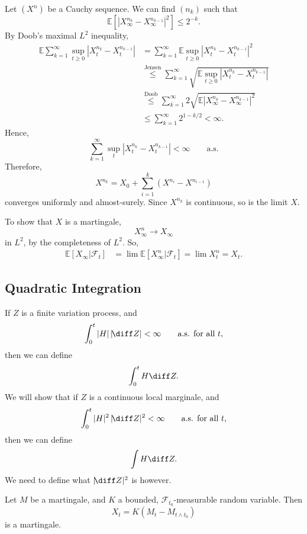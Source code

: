 \documentclass[12pt]{article}
\begin{document}
\begin{proofbox}
	Let $(X^{n})$ be a Cauchy sequence. We can find $(n_k)$ such that
	\[
	\mathbb{E}[|X_\infty^{n_k} - X_\infty^{n_{k-1}}|^2] \leq 2^{-k}.
	\]
	By Doob's maximal $L^2$ inequality,
	\begin{align*}
		\mathbb{E} \sum_{k = 1}^{\infty} \sup_{t \geq 0} |X_t^{n_k} - X_t^{n_{k-1}}| &= \sum_{k = 1}^{\infty} \mathbb{E} \sup_{t \geq 0} |X_t^{n_k} - X_t^{n_{k-1}}|^2 \\
											     &\overset{\text{Jensen}}\leq \sum_{k = 1}^{\infty} \sqrt{\mathbb{E} \sup_{t \geq 0} |X_t^{n_k} - X_t^{n_{k-1}}|} \\
											     &\overset{\text{Doob}}\leq \sum_{k = 1}^{\infty} 2 \sqrt{\mathbb{E} |X_\infty^{n_k} - X_\infty^{n_{k-1}}|^2} \\
											     &\leq \sum_{k = 1}^{\infty} 2^{1 - k/2} < \infty.
	\end{align*}
	Hence,
	\[
		\sum_{k=1}^{\infty} \sup_{t} |X_t^{n_k} - X_t^{n_{k-1}}| < \infty \qquad \text{a.s.}
	\]
	Therefore,
	\[
	X^{n_k} = X_0 + \sum_{i = 1}^{k} (X^{n_i} - X^{n_{i-1}})
	\]
	converges uniformly and almost-surely. Since $X^{n_k}$ is continuous, so is the limit $X$.

	To show that $X$ is a martingale,
	\[
	X_\infty^{n} \to X_\infty
	\]
	in $L^2$, by the completeness of $L^2$. So,
	\begin{align*}
		\mathbb{E}[X_\infty | \mathcal{F}_t] &= \lim \mathbb{E}[X_\infty^{n} | \mathcal{F}_t] = \lim X_t^{n} = X_t.
	\end{align*}
\end{proofbox}

\subsection{Quadratic Integration}%
\label{sub:qi}

If $Z$ is a finite variation process, and
\[
	\int_0^t |H| \, |\!\diff Z| < \infty \qquad \text{a.s. for all $t,$}
\]
then we can define
\[
\int_0^t H \diff Z.
\]
We will show that if $Z$ is a continuous local marginale, and
\[
	\int_0^t |H|^2 \, |\!\diff Z|^2 < \infty \qquad \text{a.s. for all $t$,}
\]
then we can define
\[
\int H \diff Z.
\]
We need to define what $|\!\diff Z|^2$ is however.

\begin{proposition}
	Let $M$ be a martingale, and $K$ a bounded, $\mathcal{F}_{t_0}$-measurable random variable. Then
	\[
	X_t = K (M_{t} - M_{t \wedge t_0})
	\]
	is a martingale.
\end{proposition}
\end{document}
